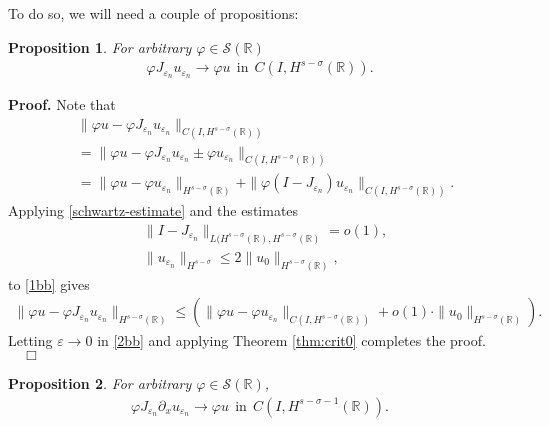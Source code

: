 \documentclass[12pt,reqno]{amsart}
\newcommand{\rr}{\mathbb{R}}
\newcommand{\p}{\partial}
\newcommand{\ee}{\varepsilon}
\newcommand{\vp}{\varphi}
\theoremstyle{plain}  %
\newtheorem{proposition}{Proposition}
\theoremstyle{definition}
\begin{document}
		To do so, we will need a couple of propositions:
		\begin{proposition}
			For arbitrary $\vp \in \mathcal{S}(\rr)$
			\label{prop:1aa}
			\begin{equation}
				\begin{split}
					\vp J_{\ee_n} u_{\ee_n} \to \vp u \ \ \text{in} \ \
					C(I, H^{s-\sigma}(\rr)).
					\label{}
				\end{split}
			\end{equation}
		\end{proposition}
			{\bf Proof.} Note that
			\begin{equation}
				\begin{split}
					& \|\vp u - \vp J_{\ee_n} u_{\ee_n}
					\|_{C(I, H^{s-\sigma}(\rr))}
					\\
					&= \|\vp u - \vp J_{\ee_n} u_{\ee_n} \pm \vp
					u_{\ee_n} \|_{C(I, H^{s-\sigma}(\rr))}
					\\
					& = \|\vp u - \vp u_{\ee_n}
					\|_{H^{s-\sigma}(\rr)} + \|\vp (I - J_{\ee_n})
					u_{\ee_n} \|_{C(I, H^{s-\sigma}(\rr))}.
					\label{1bb}
				\end{split}
			\end{equation}
			Applying \eqref{schwartz-estimate} and the estimates
			\begin{equation*}
				\begin{split}
					& \|I-J_{\ee_n} \|_{L(H^{s-\sigma}(\rr), H^{s -
					\sigma}(\rr)} = o(1),
					\\
					& \|u_{\ee_n}\|_{H^{s-\sigma}} \le 2
					\|u_0\|_{H^{s-\sigma}(\rr)},
				\end{split}
			\end{equation*}
			to \eqref{1bb} gives
			\begin{equation}
				\label{2bb}
				\begin{split}
					\|\vp u - \vp J_{\ee_n} u_{\ee_n}\|_{H^{s-\sigma}(\rr)}
					\le \left( \|\vp u - \vp u_{\ee_n}
					\|_{C(I, H^{s-\sigma}(\rr))} + o(1) \cdot \|u_0
					\|_{H^{s-\sigma}(\rr)} \right).
				\end{split}
			\end{equation}
			Letting $\ee \to 0$ in \eqref{2bb} and applying Theorem
			\ref{thm:crit0} completes the proof. $\quad \Box$
			\begin{proposition}
				\label{prop:dd}
				For arbitrary $ \vp \in \mathcal{S}(\rr)$,
				\begin{equation}
					\begin{split}
						\vp J_{\ee_n} \p_x u_{\ee_n} \to \vp u \ \
						\text{in} \ \ C(I, H^{s-\sigma-1}(\rr)).
						\label{0dd}
					\end{split}
				\end{equation}
			\end{proposition}
\end{document}
